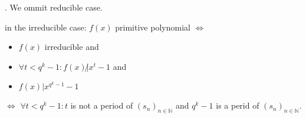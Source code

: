 \Proof.
We ommit reducible case. 

in the irreducible case: $f(x)$ primitive polynomial $\iff$ 
\begin{itemize}
  \item $f(x)$ irreducible and
  \item $\forall t < q^k -1 : f(x) \not| x^t-1$ and 
  \item $f(x) | x^{q^k-1}-1$
\end{itemize}

$\iff$ $\forall t < q^k -1: t$ is not a period of $(s_n)_{n\in \mathbb{N}}$ and $q^k-1$ is a perid of $(s_n)_{n\in \mathbb{N}}$.






















